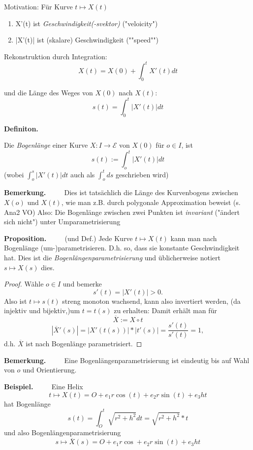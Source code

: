 \documentclass[a4paper,oneside,11pt,DIV=12,parskip=half]{scrartcl}
\newenvironment{definition}{\textbf{Definiton.} ~~~~}{}
\newenvironment{note}{\textbf{Bemerkung.} ~~~~}{}
\newenvironment{proposition}{\textbf{Proposition.} ~~~~}{}
\newenvironment{example}{\textbf{Beispiel.} ~~~~}{}
\begin{document}
Motivation: Für Kurve $t \mapsto X(t)$ 
\begin{enumerate}
	\item X'(t) ist \textit{Geschwindigkeit(-svektor)} ("veloicity")
	\item |X'(t)| ist (skalare) Geschwindigkeit (""speed"")
\end{enumerate}

Rekonstruktion durch Integration:
\[X(t)= X(0) + \int_{0}^{t}X'(t)dt\]

und die Länge des Weges von $X(0)$ nach $X(t)$:
\[s(t) = \int_{0}^{t}|X'(t)|dt\]

\begin{definition}
	
	Die \textit{Bogenlänge} einer Kurve $X: I \rightarrow \mathcal{E}$ von $X(0)$ für $o \in I$, ist
	\[s(t) := \int_{o}^{t}|X'(t)|dt\] (wobei $\int_{o}^{s}|X'(t)|dt$ auch als $\int_{o}^{t} ds$ geschrieben wird)
	
\end{definition}

\begin{note}
	Dies ist tatsächlich die Länge des Kurvenbogens zwischen $X(o)$ und $X(t)$, wie man z.B. durch polygonale Approximation beweist (s. Ana2 VO)
	Also: Die Bogenlänge zwischen zwei Punkten ist \textit{invariant} ("ändert sich nicht")
	unter Umparametrisierung 
\end{note}

\begin{proposition} (und Def.)
	Jede Kurve $t \mapsto X(t)$ kann man nach Bogenlänge (um-)parametrisieren. D.h. so, dass sie konstante Geschwindigkeit hat.
	Dies ist die \textit{Bogenlängenparametrisierung} und üblicherweise notiert $s \mapsto X(s)$ dies.
\end{proposition}
\begin{proof}
	Wähle $o \in I$ und bemerke \[s'(t) = |X'(t)| > 0.\]
	Also ist $t \mapsto s(t)$ streng monoton wachsend, kann also invertiert werden, (da injektiv und bijektiv,)um $t= t(s)$ zu erhalten: Damit erhält man für 
	\[\overline{X}:=X\circ t\]
	\[|\overline{X}'(s)|= |X'(t(s))|*|t'(s)| = \frac{s'(t)}{s'(t)}= 1,\]
	d.h. $\overline{X}$ ist nach Bogenlänge parametrisiert.
\end{proof}

\begin{note}
	Eine Bogenlängenparametrisierung ist eindeutig bis auf Wahl von $o$ und Orientierung.
\end{note}

\begin{example}
	Eine Helix \[t \mapsto X(t) = O + e_1r\cos(t)+e_2r\sin(t)+ e_3ht\]
	hat Bogenlänge \[s(t) = \int_{O}^{t} \sqrt{r^2 + h^2}dt = \sqrt{r^2+h^2}*t\]
	und also Bogenlängenparametrisierung \[s \mapsto \overline{X}(s)= O + e_1r\cos+e_2r\sin(t)+ e_3ht\]
\end{example}
\end{document}
